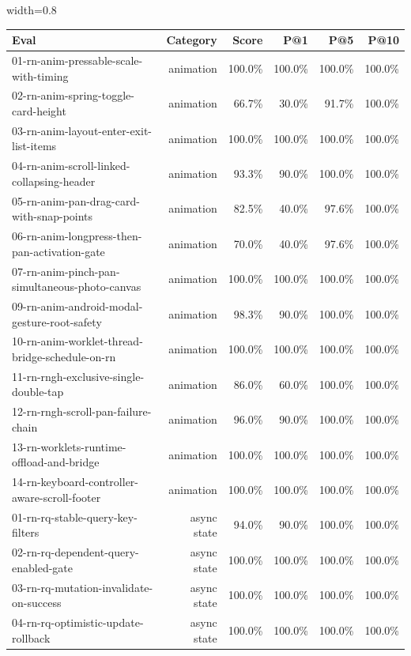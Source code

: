 \begin{table}[htbp]
\centering
\begin{adjustbox}{width=0.8\textwidth}
\begin{tabular}{lrrrrr}
\toprule
Eval & Category & Score & P@1 & P@5 & P@10 \\
\midrule
01-rn-anim-pressable-scale-with-timing & animation & 100.0\% & 100.0\% & 100.0\% & 100.0\% \\
02-rn-anim-spring-toggle-card-height & animation & 66.7\% & 30.0\% & 91.7\% & 100.0\% \\
03-rn-anim-layout-enter-exit-list-items & animation & 100.0\% & 100.0\% & 100.0\% & 100.0\% \\
04-rn-anim-scroll-linked-collapsing-header & animation & 93.3\% & 90.0\% & 100.0\% & 100.0\% \\
05-rn-anim-pan-drag-card-with-snap-points & animation & 82.5\% & 40.0\% & 97.6\% & 100.0\% \\
06-rn-anim-longpress-then-pan-activation-gate & animation & 70.0\% & 40.0\% & 97.6\% & 100.0\% \\
07-rn-anim-pinch-pan-simultaneous-photo-canvas & animation & 100.0\% & 100.0\% & 100.0\% & 100.0\% \\
09-rn-anim-android-modal-gesture-root-safety & animation & 98.3\% & 90.0\% & 100.0\% & 100.0\% \\
10-rn-anim-worklet-thread-bridge-schedule-on-rn & animation & 100.0\% & 100.0\% & 100.0\% & 100.0\% \\
11-rn-rngh-exclusive-single-double-tap & animation & 86.0\% & 60.0\% & 100.0\% & 100.0\% \\
12-rn-rngh-scroll-pan-failure-chain & animation & 96.0\% & 90.0\% & 100.0\% & 100.0\% \\
13-rn-worklets-runtime-offload-and-bridge & animation & 100.0\% & 100.0\% & 100.0\% & 100.0\% \\
14-rn-keyboard-controller-aware-scroll-footer & animation & 100.0\% & 100.0\% & 100.0\% & 100.0\% \\
01-rn-rq-stable-query-key-filters & async state & 94.0\% & 90.0\% & 100.0\% & 100.0\% \\
02-rn-rq-dependent-query-enabled-gate & async state & 100.0\% & 100.0\% & 100.0\% & 100.0\% \\
03-rn-rq-mutation-invalidate-on-success & async state & 100.0\% & 100.0\% & 100.0\% & 100.0\% \\
04-rn-rq-optimistic-update-rollback & async state & 100.0\% & 100.0\% & 100.0\% & 100.0\% \\

\end{tabular}
\end{adjustbox}
\end{table}
